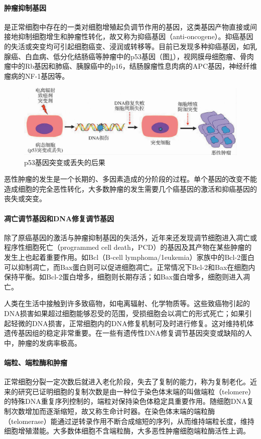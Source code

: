 \paragraph{肿瘤抑制基因}
是正常细胞中存在的一类对细胞增殖起负调节作用的基因，这类基因产物直接或间接地抑制细胞增生和肿瘤性转化，故又称为抑癌基因（anti-oncogene）。抑癌基因的失活或突变均可引起细胞癌变、浸润或转移等。目前已发现多种抑癌基因，如乳腺癌、白血病、低分化结肠癌等肿瘤中的p53基因（图\ref{fig5-22}），视网膜母细胞瘤、骨肉瘤中的Rb基因和肺癌、胰腺癌中的p16，结肠腺瘤性息肉病的APC基因，神经纤维瘤病的NF-1基因等。

\begin{figure}[!htbp]
  \centering
  \includegraphics[scale=1.1]{./images/Image00091.jpg}
  \caption{p53基因突变或丢失的后果}
  \label{fig5-22}
\end{figure}

恶性肿瘤的发生是一个长期的、多因素造成的分阶段的过程。单个基因的改变不能造成细胞的完全恶性转化，大多数肿瘤的发生需要几个癌基因的激活和抑癌基因的丧失或突变。

\paragraph{凋亡调节基因和DNA修复调节基因}
除了原癌基因的激活与肿瘤抑制基因的失活外，近年来还发现调节细胞进入凋亡或程序性细胞死亡（programmed
cell
death，PCD）的基因及其产物在某些肿瘤的发生上也起着重要作用。如Bcl（B-cell
lymphoma/1eukemia）家族中的Bcl-2蛋白可以抑制凋亡，而Bax蛋白则可以促进细胞凋亡。正常情况下Bcl-2和Bax在细胞内保持平衡。如Bcl-2蛋白增多，细胞则长期存活；如Bax蛋白增多，细胞则进入凋亡。

人类在生活中接触到许多致癌物，如电离辐射、化学物质等。这些致癌物引起的DNA损害如果超过细胞能够忍受的范围，受损细胞会以凋亡的形式死亡；如果引起轻微的DNA损害，正常细胞内的DNA修复机制可及时进行修复。这对维持机体遗传基因组的稳定非常重要。在一些有遗传性DNA修复调节基因突变或缺陷的人中，肿瘤的发病率极高。

\paragraph{端粒、端粒酶和肿瘤}
正常细胞分裂一定次数后就进入老化阶段，失去了复制的能力，称为复制老化。近来的研究已证明细胞的复制次数是由一种位于染色体末端的叫做端粒（telomere）的特殊DNA重复序列控制的，端粒对保持染色体稳定具重要作用。随细胞DNA复制次数增加而逐渐缩短，故又称生命计时器。在染色体末端的端粒酶（telomerase）能通过逆转录作用不断合成缩短的序列，从而维持端粒长度，维持细胞增殖潜能。大多数体细胞不含端粒酶，大多恶性肿瘤细胞端粒酶活性上调。

